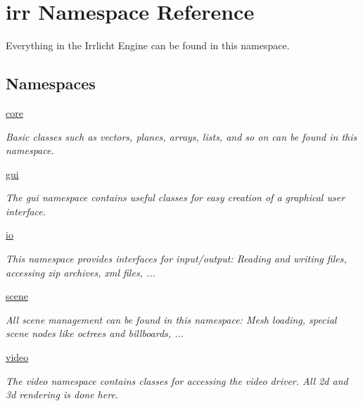 \hypertarget{namespaceirr}{}\section{irr Namespace Reference}
\label{namespaceirr}


Everything in the Irrlicht Engine can be found in this namespace.  


\subsection*{Namespaces}
\begin{DoxyCompactItemize}
\item 
 \hyperlink{namespaceirr_1_1core}{core}
\begin{DoxyCompactList}\small\item\em Basic classes such as vectors, planes, arrays, lists, and so on can be found in this namespace. \end{DoxyCompactList}\item 
 \hyperlink{namespaceirr_1_1gui}{gui}
\begin{DoxyCompactList}\small\item\em The gui namespace contains useful classes for easy creation of a graphical user interface. \end{DoxyCompactList}\item 
 \hyperlink{namespaceirr_1_1io}{io}
\begin{DoxyCompactList}\small\item\em This namespace provides interfaces for input/output\+: Reading and writing files, accessing zip archives, xml files, ... \end{DoxyCompactList}\item 
 \hyperlink{namespaceirr_1_1scene}{scene}
\begin{DoxyCompactList}\small\item\em All scene management can be found in this namespace\+: Mesh loading, special scene nodes like octrees and billboards, ... \end{DoxyCompactList}\item 
 \hyperlink{namespaceirr_1_1video}{video}
\begin{DoxyCompactList}\small\item\em The video namespace contains classes for accessing the video driver. All 2d and 3d rendering is done here. \end{DoxyCompactList}\end{DoxyCompactItemize}
